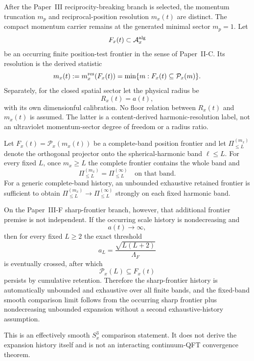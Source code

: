 \documentclass[12pt,a4paper]{article}
\begin{document}
\begin{definition}
\label{p8:def:cosmological-position-unfolding}
\leavevmode\par\noindent
After the Paper~III reciprocity-breaking branch is selected, the momentum
truncation \(m_p\) and reciprocal-position resolution \(m_x(t)\) are distinct.
The compact momentum carrier remains at the generated minimal sector
\(m_p=1\).  Let
\[
F_x(t)\subset\mathcal A_x^{\rm alg}
\]
be an occurring finite position-test frontier in the sense of Paper~II-C.
Its resolution is the derived statistic
\[
m_x(t):=m_x^{\rm res}(F_x(t))
=\min\{m:F_x(t)\subseteq\mathcal P_x(m)\}.
\]
Separately, for the closed spatial sector let the physical radius be
\[
R_x(t)=a(t),
\]
with its own dimensionful calibration.  No floor relation between \(R_x(t)\)
and \(m_x(t)\) is assumed.  The latter is a content-derived harmonic-resolution
label, not an ultraviolet momentum-sector degree of freedom or a radius ratio.
\end{definition}

\begin{proposition}
\label{p8:prop:large-mx-smooth-limit}
Let \(F_x(t)=\mathcal P_x(m_x(t))\) be a complete-band position frontier and
let \(\Pi^{(m_x)}_{\le L}\) denote the orthogonal projector onto the
spherical-harmonic band \(\ell\le L\).  For every fixed \(L\), once
\(m_x\ge L\) the complete frontier contains the whole band and
\[
\Pi^{(m_x)}_{\le L}=\Pi^{(\infty)}_{\le L}\quad\text{on that band}.
\]
For a generic complete-band history, an unbounded exhaustive retained
frontier is sufficient to obtain
\(\Pi^{(m_x)}_{\le L}\to\Pi^{(\infty)}_{\le L}\) strongly on each fixed
harmonic band.

On the Paper~III-F sharp-frontier branch, however, that additional frontier
premise is not independent.  If the occurring scale history is nondecreasing
and
\[
 a(t)\longrightarrow\infty,
\]
then for every fixed \(L\ge2\) the exact threshold
\[
 a_L=\frac{\sqrt{L(L+2)}}{\Lambda_F}
\]
is eventually crossed, after which
\[
 \boxed{\mathcal P_x(L)\subseteq F_x(t)}
\]
persists by cumulative retention.  Therefore the sharp-frontier history is
automatically unbounded and exhaustive over all finite bands, and the
fixed-band smooth comparison limit follows from the occurring sharp frontier
plus nondecreasing unbounded expansion without a second exhaustive-history
assumption.

This is an effectively smooth \(S^3_x\) comparison statement.  It does not
derive the expansion history itself and is not an interacting continuum-QFT
convergence theorem.
\end{proposition}
\end{document}
